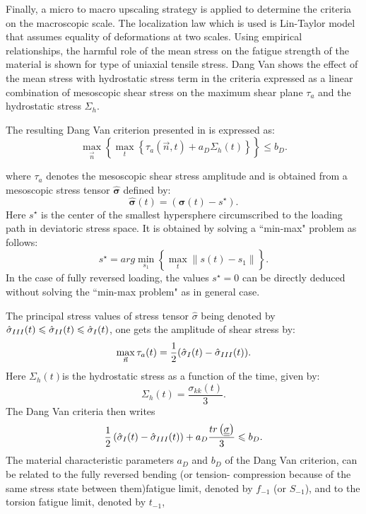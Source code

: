 Finally, a micro to macro upscaling strategy is applied to determine the criteria on the macroscopic scale. The localization law which is used is Lin-Taylor model that assumes equality of deformations at two scales. Using empirical relationships, the harmful role of the mean stress on the fatigue strength of the material is shown for type of uniaxial tensile stress. Dang Van shows the effect of the mean stress with  hydrostatic stress term in the criteria expressed as a linear combination of mesoscopic  shear stress on the maximum shear plane $\tau_a$ and the hydrostatic stress $\Sigma_h$.


The resulting Dang Van criterion presented in \cite{ballard1995high} is expressed as:
\begin{equation}
\max \limits_{\vec{n}}\left\lbrace \max \limits_{t}\left\{\tau_a{(\vec{n},t)}+a_D\Sigma_h(t)\right\}\right\rbrace \leqslant b_D.
\label{dv}
\end{equation}

where $\tau_a$ denotes the mesoscopic shear stress amplitude and is obtained from a mesoscopic stress tensor $\hat{\bm{\sigma}}$ defined by:
$$\hat{\bm{\sigma}}(t)=(\bm{\sigma}(t)-s^\star).$$
Here $s^\star$ is the center of the smallest hypersphere circumscribed to the loading path in deviatoric stress space. It is obtained by solving a ``min-max" problem as follows:
$$s^\star = arg \min\limits_{s_1}\left\{\max\limits_t\parallel s(t)-s_1\parallel\right\}.$$
In the case of fully reversed loading, the values $s^\star=0$ can be directly deduced without solving the ``min-max problem" as in general case.

The principal stress values of stress tensor $\hat{\sigma}$ being denoted by $\hat{\sigma}_{\Rmnum{3}}(t)\leqslant\hat{\sigma}_{\Rmnum{2}}(t)\leqslant\hat{\sigma}_{\Rmnum{1}}(t)$, one gets the amplitude of shear stress by:
$$\max \limits_{\vec{n}}\tau_a(t)=\frac{1}{2}(\hat{\sigma}_{\Rmnum{1}}(t)-\hat{\sigma}_{\Rmnum{3}}(t)).$$
Here $\Sigma_h(t)$is the hydrostatic stress as a function of the time, given by:$$\Sigma_h(t)=\frac{\sigma_{kk}(t)}{3}.$$
The Dang Van criteria then writes 
\begin{equation}
\frac{1}{2}\left( \hat{\sigma}_{\Rmnum{1}}(t)-\hat{\sigma}_{\Rmnum{3}}(t)\right) +a_D\dfrac{tr\left( \uline{\uline{\sigma}}\right) }{3}\leqslant b_D.
\end{equation}
The material characteristic parameters $a_D$ and $b_D$ of the Dang Van
criterion, can be related to the fully reversed bending (or tension-
compression because of the same stress state between them)fatigue limit, denoted by $f_{-1}$ (or $S_{-1}$), and to the torsion fatigue limit, denoted by $t_{-1}$,


